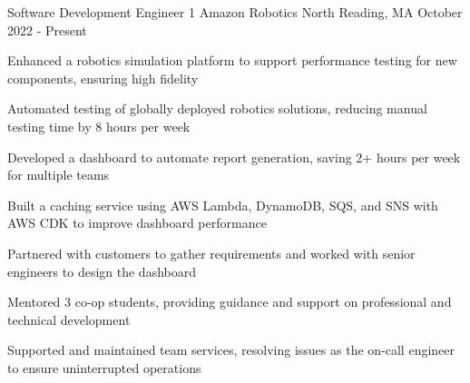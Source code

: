 

\begin{cventries}

  
	\cventry
	{Software Development Engineer 1}
	{Amazon Robotics}
	{North Reading, MA}
	{October 2022 - Present}
	{\begin{cvitems}
		\item { Enhanced a robotics simulation platform to support performance testing for new components, ensuring high fidelity}
		\item {Automated testing of globally deployed robotics solutions, reducing manual testing time by 8 hours per week}
		\item {Developed a dashboard to automate report generation, saving 2+ hours per week for multiple teams}
		\item {Built a caching service using AWS Lambda, DynamoDB, SQS, and SNS with AWS CDK to improve dashboard performance}
		\item {Partnered with customers to gather requirements and worked with senior engineers to design the dashboard}
		\item {Mentored 3 co-op students, providing guidance and support on professional and technical development}
		\item {Supported and maintained team services, resolving issues as the on-call engineer to ensure uninterrupted operations}
		\end{cvitems}}
  

\end{cventries}
